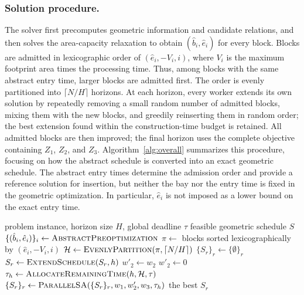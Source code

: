 \documentclass[runningheads]{llncs}
\begin{document}
\subsubsection{Solution procedure.}
The solver first precomputes geometric information and candidate relations,
and then solves the area-capacity relaxation to obtain $(\hat b_i,\hat e_i)$
for every block. Blocks are admitted in lexicographic order of
$(\hat e_i,-V_i,i)$, where $V_i$ is the maximum footprint area times the processing time. Thus, among blocks with the same abstract entry time, larger blocks are admitted first. The order is evenly partitioned into $\lceil N/H\rceil$ horizons. At each horizon, every worker extends its own solution by repeatedly removing a small random number of admitted blocks, mixing them with the new blocks, and greedily reinserting them in random order; the best extension found within the construction-time budget is retained. All admitted blocks are then improved;
the final horizon uses the complete objective containing $Z_1$, $Z_2$, and
$Z_3$. Algorithm~\ref{alg:overall} summarizes this procedure, focusing on how
the abstract schedule is converted into an exact geometric schedule. The
abstract entry times determine the admission order and provide a reference
solution for insertion, but neither the bay nor the entry time is fixed in the
geometric optimization. In particular, $\hat e_i$ is not imposed as a lower
bound on the exact entry time.

\begin{algorithm}[t]
\caption{Overall solution procedure}
\label{alg:overall}
\begin{algorithmic}[1]
\Require problem instance, horizon size $H$, global deadline $\tau$
\Ensure feasible geometric schedule $S$
\State $\{(\hat b_i,\hat e_i)\}_i \gets \Call{AbstractPreoptimization}{}$
\State $\pi \gets$ blocks sorted lexicographically by $(\hat e_i,-V_i,i)$
\State $\mathcal{H} \gets \Call{EvenlyPartition}{\pi,\lceil N/H\rceil}$
\State $\{S_r\}_r\gets\{\emptyset\}_r$ 
        \State $S_r\gets\Call{ExtendSchedule}{S_r,h}$
    \EndFor
        \State $w'_2\gets w_2$
    \Else
        \State $w'_2\gets 0$
    \EndIf
    \State $\tau_h\gets\Call{AllocateRemainingTime}{h,\mathcal{H},\tau}$
    \State $\{S_r\}_r\gets\Call{ParallelSA}{\{S_r\}_r,w_1,w'_2,w_3,\tau_h}$
\EndFor
\State \Return the best $S_r$
\end{algorithmic}
\end{algorithm}
\end{document}
